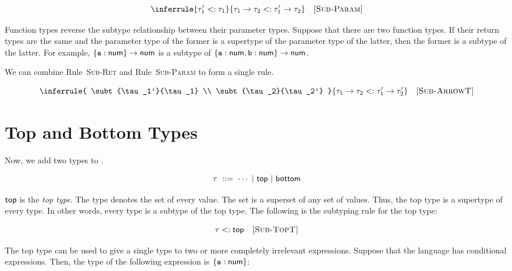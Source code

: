 \vspace{-1em}

\[
  \inferrule
  { \subt{\tau_1'}{\tau_1} }
  { \subt{\tarrow{\tau_1}{\tau_2}}{\tarrow{\tau_1'}{\tau_2}} }
  \quad\textsc{[Sub-Param]}
\]

Function types reverse the subtype relationship between their parameter types.
Suppose that there are two function types. If their return types are the same
and the parameter type of the former is a supertype of the parameter type of the latter, then
the former is a subtype of the latter.
For example, $\{\texttt{a}:\textsf{num}\}\rightarrow\textsf{num}$
is a subtype of $\{\texttt{a}:\textsf{num},\texttt{b}:\textsf{num}\}\rightarrow\textsf{num}$.

We can combine Rule~\textsc{Sub-Ret} and Rule~\textsc{Sub-Param} to form a
single rule.


\vspace{-1em}

\[
  \inferrule
  { \subt{\tau_1'}{\tau_1} \\
    \subt{\tau_2}{\tau_2'} }
  { \subt{\tarrow{\tau_1}{\tau_2}}{\tarrow{\tau_1'}{\tau_2'}} }
  \quad\textsc{[Sub-ArrowT]}
\]

\section{Top and Bottom Types}

Now, we add two types to \lang.

\[ \tau \ ::= \ \cdots \ |\ \ttop \ |\ \tbot \]

$\textsf{top}$ is the \textit{top type}. The type denotes the set of
every value. The set is a superset of any set of values. Thus, the top type is a
supertype of every type. In other words, every type is a subtype of the top
type. The following is the subtyping rule for the top type:


\[
  \tau<:\textsf{top}
  \quad\textsc{[Sub-TopT]}
\]

The top type can be used to give a single type to two or more completely
irrelevant expressions. Suppose that the language has conditional expressions.
Then, the type of the following expression is $\{\texttt{a}:\textsf{num}\}$:

